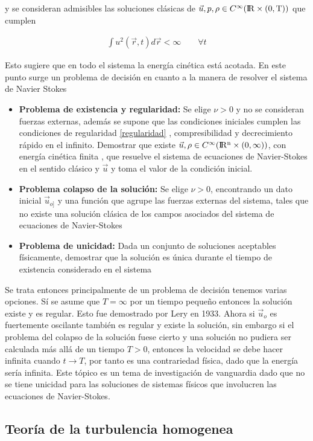 \noindent y se consideran admisibles las soluciones clásicas de $\vec{u},p,\rho\in C^{\infty}(\rm I\!R\times(0,T))$ que cumplen 

\begin{eqnarray}
\int u^{2}(\vec{r},t)d\vec{r} < \infty\qquad \forall t
\end{eqnarray}

\noindent Esto sugiere que en todo el sistema la energía cinética está acotada. En este punto surge un problema de decisión en cuanto a la manera de resolver el sistema de Navier Stokes

\begin{itemize}
    \item \textbf{Problema de existencia y regularidad:} Se elige $\nu > 0$ y no se consideran fuerzas externas, además se supone que las condiciones iniciales cumplen las condiciones de regularidad \eqref{regularidad} , compresibilidad y decrecimiento rápido en el infinito. Demostrar que existe $\vec{u},\rho\in C^{\infty}(\rm I\!R^{n}\times(0,\infty))$, con energía cinética finita , que resuelve el sistema de ecuaciones de Navier-Stokes en el sentido clásico y $\vec{u}$ y toma el valor de la condición inicial. 
    
    
    
    \item \textbf{Problema colapso de la solución:} Se elige $\nu>0$, encontrando un dato inicial $\vec{u}_{o]}$ y una función que agrupe las fuerzas externas del sistema, tales que no existe una solución clásica de los campos asociados del sistema de ecuaciones de Navier-Stokes 
    
    \item \textbf{Problema de unicidad:} Dada un conjunto de soluciones aceptables físicamente, demostrar que la solución es única durante el tiempo de existencia considerado en el sistema 
    
\end{itemize}

\noindent Se trata entonces principalmente de un problema de decisión tenemos varias opciones. Sí se asume que $T=\infty$ por un tiempo pequeño entonces la solución existe y es regular. Esto fue demostrado por Lery en 1933. Ahora si $\vec{u}_{o}$ es fuertemente oscilante también es regular y existe la solución, sin embargo si el problema del colapso de la solución fuese cierto y una solución no pudiera ser calculada más allá de un tiempo $T>0$, entonces la velocidad se debe hacer infinita cuando $t\rightarrow T$, por tanto es una contrariedad física, dado que la energía sería infinita. Este tópico es un tema de investigación de vanguardia dado que no se tiene unicidad para las soluciones de sistemas físicos que involucren las ecuaciones de Navier-Stokes.

\subsection{Teoría de la turbulencia homogenea}





